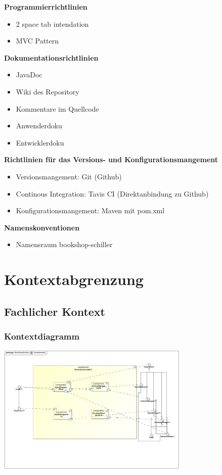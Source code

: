 \documentclass[a4paper]{article}
\begin{document}
\textbf{Programmierrichtlinien}
\begin{itemize}
	\item 2 space tab intendation
	\item MVC Pattern
\end{itemize}
\textbf{Dokumentationsrichtlinien}
\begin{itemize}
	\item JavaDoc
	\item Wiki des Repository
	\item Kommentare im Quellcode
	\item Anwenderdoku
	\item Entwicklerdoku
\end{itemize}
\textbf{Richtlinien für das Versions- und Konfigurationsmangement}
\begin{itemize}
	\item Versionsmangement: Git (Github)
	\item Continous Integration: Tavis CI (Direktanbindung zu Github)
	\item Konfigurationsmangement: Maven mit pom.xml
\end{itemize}
\textbf{Namenskonventionen}
\begin{itemize}
	\item Namensraum bookshop-schiller
\end{itemize}

\section{Kontextabgrenzung}

\subsection{Fachlicher Kontext}

\subsubsection{Kontextdiagramm}

\includegraphics[width=350px]{kontextmodell.jpg}
\end{document}
